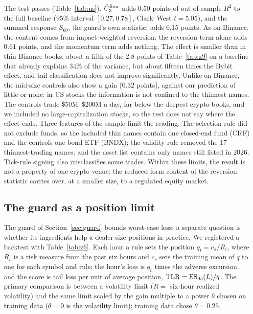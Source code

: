 \documentclass[12pt]{article}
\theoremstyle{definition}
\theoremstyle{remark}
\begin{document}
The test passes (Table~\ref{tab:us}). $\hat C_3^{\rm flow}$ adds $0.50$ points of out-of-sample $R^2$ to the full baseline (95\% interval $[0.27,0.78]$, Clark--West $t=5.05$), and the summed response $S_{60}$, the guard's own statistic, adds $0.15$ points. As on Binance, the content comes from impact-weighted reversion: the reversion term alone adds $0.61$ points, and the momentum term adds nothing. The effect is smaller than in thin Binance books, about a fifth of the $2.8$ points of Table~\ref{tab:z9} on a baseline that already explains $34\%$ of the variance, but about fifteen times the Bybit effect, and tail classification does not improve significantly. Unlike on Binance, the mid-size controls also show a gain ($0.32$ points), against our prediction of little or none: in US stocks the information is not confined to the thinnest names. The controls trade \$50M--\$200M a day, far below the deepest crypto books, and we included no large-capitalization stocks, so the test does not say where the effect ends. Three features of the sample limit the reading. The selection rule did not exclude funds, so the included thin names contain one closed-end fund (CRF) and the controls one bond ETF (BNDX); the validity rule removed the 17 thinnest-trading names; and the asset list contains only names still listed in 2026. Tick-rule signing also misclassifies some trades. Within these limits, the result is not a property of one crypto venue: the reduced-form content of the reversion statistic carries over, at a smaller size, to a regulated equity market.

\subsection{The guard as a position limit}\label{sec:backtest}
The guard of Section~\ref{sec:guard} bounds worst-case loss; a separate question is whether its ingredients help a dealer size positions in practice. We registered a backtest with Table~\ref{tab:z6}. Each hour a rule sets the position $q_t=c_s/R_t$, where $R_t$ is a risk measure from the past six hours and $c_s$ sets the training mean of $q$ to one for each symbol and rule; the hour's loss is $q_t$ times the adverse excursion, and the score is tail loss per unit of average position, ${\rm TLR}={\rm ES}_{95}(L)/\overline q$. The primary comparison is between a volatility limit ($R=$ six-hour realized volatility) and the same limit scaled by the gain multiple to a power $\theta$ chosen on training data ($\theta=0$ is the volatility limit); training data chose $\theta=0.25$.
\end{document}
